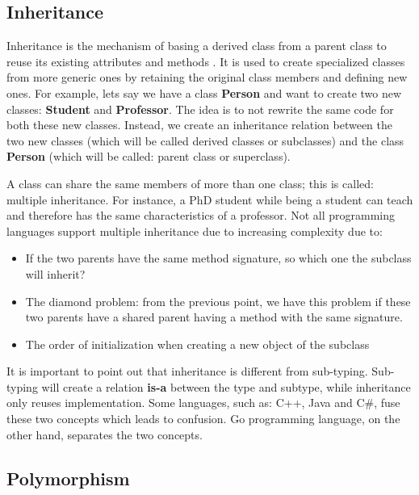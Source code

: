 \documentclass[12pt]{book}
\begin{document}
\subsection{Inheritance}

Inheritance is the mechanism of basing a derived class from a parent class to reuse its existing attributes and methods \citep{2016-techdifferences}. 
It is used to create specialized classes from more generic ones by retaining the original class members and defining new ones. 
For example, lets say we have a class \textbf{Person} and want to create two new classes: \textbf{Student} and \textbf{Professor}. 
The idea is to not rewrite the same code for both these new classes. 
Instead, we create an inheritance relation between the two new classes (which will be called derived classes or subclasses) and the class \textbf{Person} (which will be called: parent class or superclass). 

A class can share the same members of more than one class; this is called: multiple inheritance. 
For instance, a PhD student while being a student can teach and therefore has the same characteristics of a professor. 
Not all programming languages support multiple inheritance due to increasing complexity due to:
\begin{itemize}
	\item If the two parents have the same method signature, so which one the subclass will inherit?
	\item The diamond problem: from the previous point, we have this problem if these two parents have a shared parent having a method with the same signature.
	\item The order of initialization when creating a new object of the subclass 
\end{itemize}

It is important to point out that inheritance is different from sub-typing\citep{1989-cook-al}. 
Sub-typing will create a relation \textbf{is-a} between the type and subtype, while inheritance only reuses implementation.
Some languages, such as: C++, Java and C\#, fuse these two concepts which leads to confusion.
Go programming language, on the other hand, separates the two concepts.  

\subsection{Polymorphism}
\end{document}
